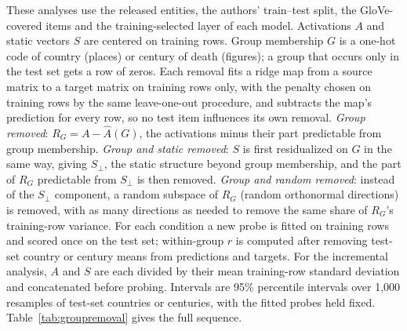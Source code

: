 \documentclass[11pt]{article}
\begin{document}
These analyses use the released entities, the authors' train--test split, the GloVe-covered
items and the training-selected layer of each model. Activations $A$ and static vectors $S$
are centered on training rows. Group membership $G$ is a one-hot code of country (places)
or century of death (figures); a group that occurs only in the test set gets a row of zeros.
Each removal fits a ridge map from a source matrix to a target matrix on training rows only,
with the penalty chosen on training rows by the same leave-one-out procedure, and subtracts the map's
prediction for every row, so no test item influences its own removal. \emph{Group removed}:
$R_G = A - \hat{A}(G)$, the activations minus their part predictable from group
membership. \emph{Group and static removed}: $S$ is first residualized on $G$ in the same
way, giving $S_\perp$, the static structure beyond group membership, and the part of $R_G$
predictable from $S_\perp$ is then removed. \emph{Group and random removed}: instead of the
$S_\perp$ component, a random subspace of $R_G$ (random orthonormal directions) is removed,
with as many directions as needed to remove the same share of $R_G$'s training-row variance.
For each condition a new probe is fitted on training rows and scored once on the test set;
within-group $r$ is computed after removing test-set country or century means from
predictions and targets. For the incremental analysis, $A$ and $S$ are each divided by
their mean training-row standard deviation and concatenated before probing. Intervals are
95\% percentile intervals over 1{,}000 resamples of test-set countries or centuries, with
the fitted probes held fixed. Table~\ref{tab:groupremoval} gives the full sequence.
\end{document}
